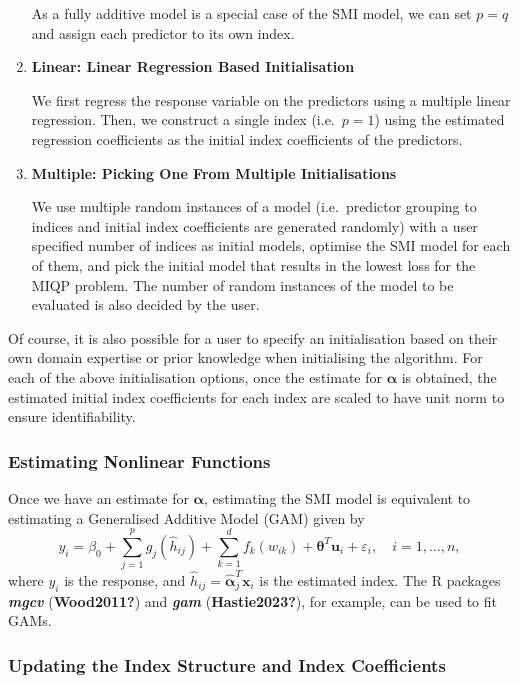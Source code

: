 \documentclass[
  11pt,
  a4paper,
]{report}
\begin{document}
\begin{enumerate}
  As a fully additive model is a special case of the SMI model, we can
  set \(p=q\) and assign each predictor to its own index.
\item
  \textbf{Linear: Linear Regression Based Initialisation}

  We first regress the response variable on the predictors using a
  multiple linear regression. Then, we construct a single index
  (i.e.~\(p = 1\)) using the estimated regression coefficients as the
  initial index coefficients of the predictors.
\item
  \textbf{Multiple: Picking One From Multiple Initialisations}

  We use multiple random instances of a model (i.e.~predictor grouping
  to indices and initial index coefficients are generated randomly) with
  a user specified number of indices as initial models, optimise the SMI
  model for each of them, and pick the initial model that results in the
  lowest loss for the MIQP problem. The number of random instances of
  the model to be evaluated is also decided by the user.
\end{enumerate}

Of course, it is also possible for a user to specify an initialisation
based on their own domain expertise or prior knowledge when initialising
the algorithm. For each of the above initialisation options, once the
estimate for \(\bm{\alpha}\) is obtained, the estimated initial index
coefficients for each index are scaled to have unit norm to ensure
identifiability.

\subsubsection{Estimating Nonlinear Functions}\label{sec-step2}

Once we have an estimate for \(\bm{\alpha}\), estimating the SMI model
is equivalent to estimating a Generalised Additive Model (GAM) given by
\[
  y_{i} = \beta_{0} + \sum_{j = 1}^{p}g_{j}(\hat{h}_{ij}) + \sum_{k = 1}^{d}f_{k}(w_{ik}) + \bm{\theta}^{T}\bm{u}_{i} + \varepsilon_{i}, \quad i = 1, \dots, n,
\] where \(y_{i}\) is the response, and
\(\hat{h}_{ij} = \hat{\bm{\alpha}}_{j}^{T}\bm{x}_{i}\) is the estimated
index. The R packages \textbf{\emph{mgcv}} (\textbf{Wood2011?}) and
\textbf{\emph{gam}} (\textbf{Hastie2023?}), for example, can be used to
fit GAMs.

\subsubsection{Updating the Index Structure and Index
Coefficients}\label{sec-step3}
\end{document}
